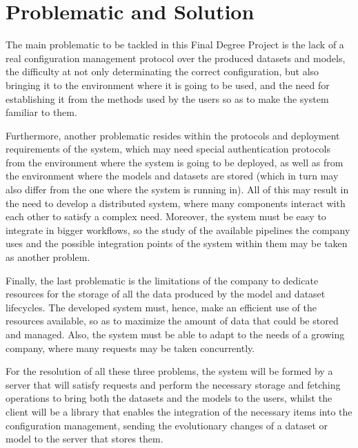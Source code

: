 \section{Problematic and Solution}

The main problematic to be tackled in this Final Degree Project is the lack of a real configuration management protocol over the produced datasets and models, the difficulty at
not only determinating the correct configuration, but also bringing it to the environment where it is going to be used, and the need for establishing it from the methods used
by the users so as to make the system familiar to them.

Furthermore, another problematic resides within the protocols and deployment requirements of the system, which may need special authentication protocols from
the environment where the system is going to be deployed, as well as from the environment where the models and datasets are stored (which in turn may also differ
from the one where the system is running in). All of this may result in the need to develop a distributed system, where many components interact with each other
to satisfy a complex need. Moreover, the system must be easy to integrate in bigger workflows, so the study of the available pipelines the company uses and the 
possible integration points of the system within them may be taken as another problem.

Finally, the last problematic is the limitations of the company to dedicate resources for the storage of all the data produced by the model and dataset lifecycles.
The developed system must, hence, make an efficient use of the resources available, so as to maximize the amount of data that could be stored and managed. Also,
the system must be able to adapt to the needs of a growing company, where many requests may be taken concurrently.

For the resolution of all these three problems, the system will be formed by a server that will satisfy requests and perform the necessary storage and
fetching operations to bring both the datasets and the models to the users, whilst the client will be a library that enables the integration of the
necessary items into the configuration management, sending the evolutionary changes of a dataset or model to the server that stores them.


